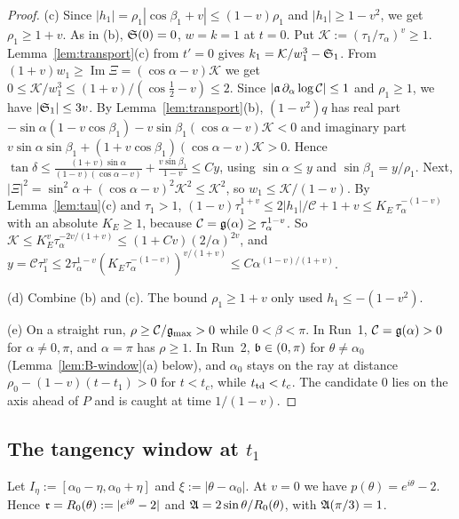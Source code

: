 \begin{proof}
(c) Since $|h_1|=\rho_1|\cos\beta_1+v|\le(1-v)\rho_1$ and $|h_1|\ge1-v^2$, we get $\rho_1\ge1+v$. As in (b), $\mathfrak{S}(0)=0$, $w=k=1$
at $t=0$.
Put $\mathcal K:=(\tau_1/\tau_\alpha)^v\ge1$. Lemma~\ref{lem:transport}(c) from $t'=0$ gives
$k_1=\mathcal K/w_1^3-\mathfrak{S}_1$. From $(1+v)w_1\ge\operatorname{Im}\Xi=(\cos\alpha-v)\mathcal K$ we get
$0\le\mathcal K/w_1^3\le(1+v)/(\cos\frac12-v)\le2$. Since $|\mathfrak{a}\,\partial_\alpha\log\mathcal C|\le1$ and $\rho_1\ge1$, we have $|\mathfrak{S}_1|\le3v$.
By Lemma~\ref{lem:transport}(b), $(1-v^2)q$ has real part $-\sin\alpha(1-v\cos\beta_1)-v\sin\beta_1(\cos\alpha-v)\mathcal K<0$ and
imaginary part $v\sin\alpha\sin\beta_1+(1+v\cos\beta_1)(\cos\alpha-v)\mathcal K>0$. Hence
$\tan\delta\le\frac{(1+v)\sin\alpha}{(1-v)(\cos\alpha-v)}+\frac{v\sin\beta_1}{1-v}\le Cy$, using $\sin\alpha\le y$ and
$\sin\beta_1=y/\rho_1$. Next, $|\Xi|^2=\sin^2\alpha+(\cos\alpha-v)^2\mathcal K^2\le\mathcal K^2$, so $w_1\le\mathcal K/(1-v)$. By
Lemma~\ref{lem:tau}(c) and $\tau_1>1$, $(1-v)\tau_1^{1+v}\le2|h_1|/\mathcal C+1+v\le K_E\,\tau_\alpha^{-(1-v)}$ with an absolute $K_E\ge1$, because
$\mathcal C=\mathfrak{g}(\alpha)\ge\tau_\alpha^{1-v}$. So $\mathcal K\le K_E^{v}\tau_\alpha^{-2v/(1+v)}\le(1+Cv)(2/\alpha)^{2v}$, and
$y=\mathcal C\tau_1^v\le2\tau_\alpha^{1-v}(K_E\tau_\alpha^{-(1-v)})^{v/(1+v)}\le C\alpha^{(1-v)/(1+v)}$.

(d) Combine (b) and (c). The bound $\rho_1\ge1+v$ only used $h_1\le-(1-v^2)$.

(e) On a straight run, $\rho\ge \mathcal C/\mathfrak{g}_{\max}>0$ while $0<\beta<\pi$. In Run~1, $\mathcal C=\mathfrak{g}(\alpha)>0$ for $\alpha\ne0,\pi$, and $\alpha=\pi$ has
$\rho\ge1$. In Run~2, $\mathfrak{b}\in(0,\pi)$ for $\theta\ne\alpha_0$ (Lemma~\ref{lem:B-window}(a) below), and $\alpha_0$ stays on the
ray at distance $\rho_0-(1-v)(t-t_1)>0$ for $t<t_c$, while $t_{\mathrm{td}}<t_c$. The candidate $0$ lies on the axis ahead of $P$ and is
caught at time $1/(1-v)$.
\end{proof}

\subsection{The tangency window at $t_1$}\label{app:B-window}

Let $I_\eta:=[\alpha_0-\eta,\alpha_0+\eta]$ and $\xi:=|\theta-\alpha_0|$. At $v=0$ we have $p(\theta)=e^{i\theta}-2$. Hence
$\mathfrak{r}=R_0(\theta):=|e^{i\theta}-2|$ and $\mathfrak{A}=2\sin\theta/R_0(\theta)$, with $\mathfrak{A}(\pi/3)=1$.

